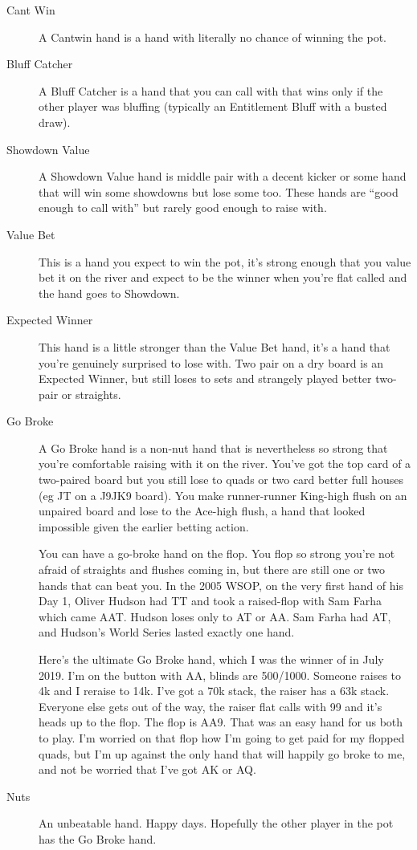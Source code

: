 \begin{description}

\item[Cant Win] A Cantwin hand is a hand with literally no chance of
winning the pot.

\item[Bluff Catcher] A Bluff Catcher is a hand that you can call with
that wins only if the other player was bluffing (typically an
Entitlement Bluff with a busted draw).

\item[Showdown Value] A Showdown Value hand is middle pair with a
decent kicker or some hand that will win some showdowns but lose some
too. These hands are ``good enough to call with'' but rarely good
enough to raise with.

\item[Value Bet] This is a hand you expect to win the pot, it's strong
enough that you value bet it on the river and expect to be the winner
when you're flat called and the hand goes to Showdown.

\item[Expected Winner] This hand is a little stronger than the Value
Bet hand, it's a hand that you're genuinely surprised to lose
with. Two pair on a dry board is an Expected Winner, but still loses
to sets and strangely played better two-pair or straights.

\item[Go Broke] A Go Broke hand is a non-nut hand that is nevertheless
so strong that you're comfortable raising with it on the river. You've
got the top card of a two-paired board but you still lose to quads or
two card better full houses (eg JT on a J9JK9 board). You make
runner-runner King-high flush on an unpaired board and lose to the
Ace-high flush, a hand that looked impossible given the earlier
betting action.

You can have a go-broke hand on the flop. You flop so strong you're
not afraid of straights and flushes coming in, but there are still one
or two hands that can beat you. In the 2005 WSOP, on the very first
hand of his Day 1, Oliver Hudson had TT and took a raised-flop with
Sam Farha which came AAT. Hudson loses only to AT or AA. Sam Farha had
AT, and Hudson's World Series lasted exactly one hand.

Here's the ultimate Go Broke hand, which I was the winner of in July 2019.
I'm on the button with AA, blinds are 500/1000. Someone raises to 4k and
I reraise to 14k. I've got a 70k stack, the raiser has a 63k stack.
Everyone else gets out of the way, the raiser flat calls with 99
and it's heads up to the flop. The flop is AA9. That was an easy hand
for us both to play. I'm worried on that flop how I'm going to get
paid for my flopped quads, but I'm up against the only hand that will
happily go broke to me, and not be worried that I've got AK or AQ.

\item[Nuts] An unbeatable hand. Happy days. Hopefully the other player
in the pot has the Go Broke hand.

\end{description}

